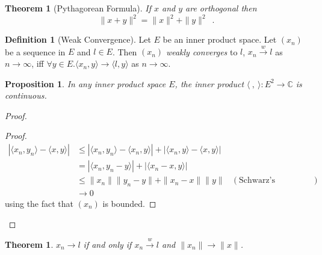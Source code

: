 \documentclass{book}
\let\qed\relax
\newtheorem{prop}[ax]{Proposition}
\newtheorem{thm}[ax]{Theorem}
\theoremstyle{definition}
\newtheorem{df}[ax]{Definition}
\begin{document}
\begin{thm}[Pythagorean Formula]
If $x$ and $y$ are orthogonal then
\[ \| x + y \|^2 = \|x\|^2 + \|y\|^2 \enspace . \]
\end{thm}

\begin{df}[Weak Convergence]
Let $E$ be an inner product space. Let $(x_n)$ be a sequence in $E$ and $l \in E$. Then $(x_n)$ \emph{weakly converges} to $l$, $x_n \stackrel{w}{\rightarrow} l$ as $n \rightarrow \infty$, iff $\forall y \in E. \langle x_n, y \rangle \rightarrow \langle l,y \rangle$ as $n \rightarrow \infty$.
\end{df}

\begin{prop}
In any inner product space $E$, the inner product $\langle \ , \ \rangle : E^2 \rightarrow \mathbb{C}$ is continuous.
\end{prop}

\begin{proof}
\pf
{}
\begin{proof}
	\pf
	\begin{align*}
		|\langle x_n, y_n \rangle - \langle x,y \rangle| & \leq |\langle x_n, y_n \rangle - \langle x_n, y \rangle | + |\langle x_n, y \rangle - \langle x,y \rangle| \\
		& = |\langle x_n, y_n - y \rangle | + |\langle x_n - x, y \rangle| \\
		& \leq \| x_n \| \| y_n - y \| + \| x_n - x \| \| y \| & (\text{Schwarz's Inequality}) \\
		& \rightarrow 0
	\end{align*}
	using the fact that $(x_n)$ is bounded.
\end{proof}
\qed
\end{proof}

\begin{thm}
$x_n \rightarrow l$ if and only if $x_n \stackrel{w}{\rightarrow} l$ and $\|x_n\| \rightarrow \|x\|$.
\end{thm}
\end{document}
